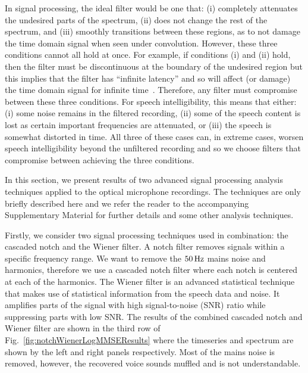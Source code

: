 \documentclass[paper-main.tex]{subfiles}
\begin{document}
In signal processing, the ideal filter would be one that:
(i) completely attenuates the undesired parts of the spectrum, 
(ii) does not change the rest of the spectrum, and 
(iii) smoothly transitions between these regions, as to not damage the time domain signal when seen under convolution. 
However, these three conditions cannot all hold at once. For example, if conditions (i) and (ii) hold, then the filter must be discontinuous at the boundary of the undesired region but this implies that the filter has ``infinite latency'' and so will affect (or damage) the time domain signal for infinite time~\cite{10.5555/151045}. Therefore, any filter must compromise between these three conditions. For speech intelligibility, this means that either: (i) some noise remains in the filtered recording, (ii) some of the speech content is lost as certain important frequencies are attenuated, or (iii) the speech is somewhat distorted in time. All three of these cases can, in extreme cases, worsen speech intelligibility beyond the unfiltered recording and so we choose filters that compromise between achieving the three conditions.


In this section, we present results of two advanced signal processing analysis techniques applied to the optical microphone recordings. 
The techniques are only briefly described here and we refer the reader to the accompanying Supplementary Material for further details and some other analysis techniques. 


Firstly, we consider two signal processing techniques used in combination: the cascaded notch and the Wiener filter. 
A notch filter removes signals within a specific frequency range. 
We want to remove the $50\,{\rm Hz}$ mains noise and harmonics, therefore we use a cascaded notch filter where each notch is centered at each of the harmonics. 
The Wiener filter is an advanced statistical technique that makes use of statistical information from the speech data and noise. 
It amplifies parts of the signal with high signal-to-noise (SNR) ratio while suppressing parts with low SNR. 
The results of the combined cascaded notch and Wiener filter are shown in the third row of Fig.~\ref{fig:notchWienerLogMMSEResults} where the timeseries and spectrum are shown by the left and right panels respectively. 
Most of the mains noise is removed, however, the recovered voice sounds muffled and is not understandable. 
\end{document}

